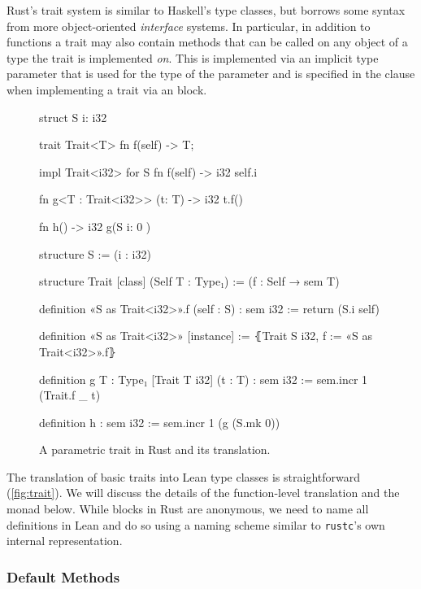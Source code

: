 Rust's trait system is similar to Haskell's type classes, but borrows some
syntax from more object-oriented \emph{interface} systems. In particular, in addition
to functions a trait may also contain methods that can be called on any object
of a type the trait is implemented \emph{on}. This is implemented via an implicit
type parameter  that is used for the type of the 
parameter and is specified in the  clause when implementing a trait via an  block.

\begin{figure}[bt]
\begin{sbs1}
struct S { i: i32 }

trait Trait<T> {
  fn f(self) -> T;
}

impl Trait<i32> for S {
  fn f(self) -> i32 {
    self.i
  }
}

fn g<T : Trait<i32>>
  (t: T) -> i32 {
  t.f()
}

fn h() -> i32 {
  g(S { i: 0 })
}
\end{sbs1}
\begin{sbs2}
structure S := (i : i32)

structure Trait [class] (Self T : Type₁) :=
(f : Self → sem T)

definition «S as Trait<i32>».f (self : S) : sem i32 :=
return (S.i self)

definition «S as Trait<i32>» [instance] :=
⦃Trait S i32, f := «S as Trait<i32>».f⦄

definition g {T : Type₁} [Trait T i32] (t : T) : sem i32 :=
sem.incr 1 (Trait.f _ t)

definition h : sem i32 :=
sem.incr 1 (g (S.mk 0))
\end{sbs2}

\caption{A parametric trait in Rust and its translation.}
\label{fig:trait}
\end{figure}

The translation of basic traits into Lean type classes is straightforward
(\autoref{fig:trait}). We will discuss the details of the function-level translation and the 
monad below. While  blocks in Rust are anonymous, we need to name all
definitions in Lean and do so using a naming scheme similar to \texttt{rustc}'s
own internal representation.

\subsubsection{Default Methods}

